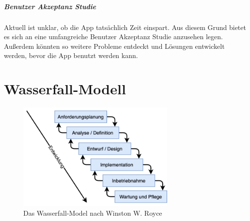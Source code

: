 \documentclass[notables, nomenclature, oneside, 150]{HSMW-Thesis}
\begin{document}
	\paragraph*{Benutzer Akzeptanz Studie}\label{pa:akzeptanz}
		Aktuell ist unklar, ob die App tatsächlich Zeit einspart. Aus diesem Grund bietet es sich an eine umfangreiche Benutzer Akzeptanz Studie anzusehen legen. Außerdem könnten so weitere Probleme entdeckt und Lösungen entwickelt werden, bevor die App benutzt werden kann.
	
	

\Anhang

\chapter{Wasserfall-Modell}
	\begin{figure}[th]
   		\centering
   		\includegraphics[width=0.7\textwidth]{img/waterfall}
   		\caption{Das Wasserfall-Model nach Winston W. Royce}
   		\label{fig:waterfall}
   \end{figure}
\end{document}
